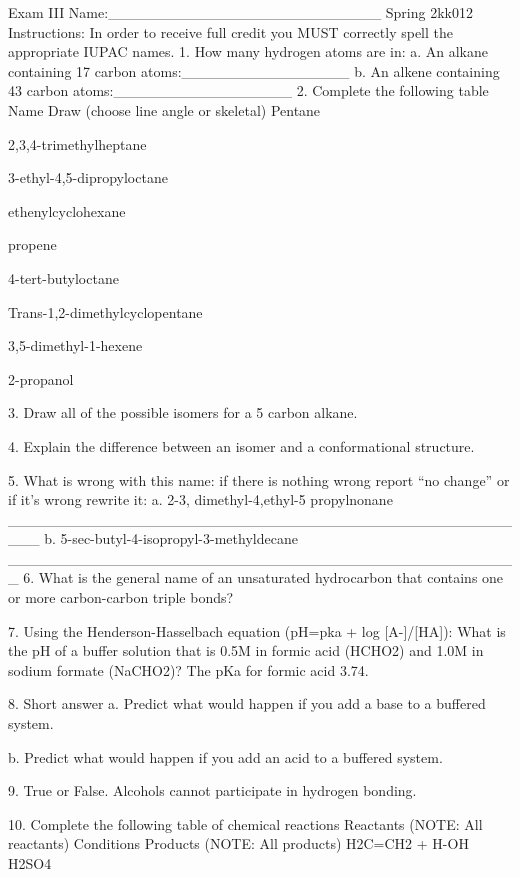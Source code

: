 \documentclass[addpoints, 12pt]{exam}
\begin{document}
\begin{questions}
Exam III
Name:__________________________							Spring 2kk012
Instructions:  In order to receive full credit you MUST correctly spell the appropriate IUPAC names.
1. How many hydrogen atoms are in:
a. An alkane containing 17 carbon atoms:________________
b. An alkene containing 43 carbon atoms:_________________
2. Complete the following table
Name
Draw (choose line angle or skeletal)
Pentane

2,3,4-trimethylheptane



3-ethyl-4,5-dipropyloctane





ethenylcyclohexane

propene

4-tert-butyloctane

Trans-1,2-dimethylcyclopentane





3,5-dimethyl-1-hexene

2-propanol



3. Draw all of the possible isomers for a 5 carbon alkane.



4. Explain the difference between an isomer and a conformational structure.


5.  What is wrong with this name: if there is nothing wrong report “no change” or if it’s wrong rewrite it:
a.  2-3, dimethyl-4,ethyl-5 propylnonane ___________________________________________________
b. 5-sec-butyl-4-isopropyl-3-methyldecane _________________________________________________
6. What is the general name of an unsaturated hydrocarbon that contains one or more carbon-carbon triple bonds?

7. Using the Henderson-Hasselbach equation (pH=pka + log [A-]/[HA]): What is the pH of a buffer solution that is 0.5M in formic acid (HCHO2) and 1.0M in sodium formate (NaCHO2)? The pKa for formic acid 3.74. 




8. Short answer
a. Predict what would happen if you add a base to a buffered system.

b. Predict what would happen if you add an acid to a buffered system.


9. True or False.  Alcohols cannot participate in hydrogen bonding.


10. Complete the following table of chemical reactions
Reactants (NOTE: All reactants)
Conditions
Products (NOTE: All products) 
H2C=CH2 + H-OH 
H2SO4


\end{questions}
\end{document}
